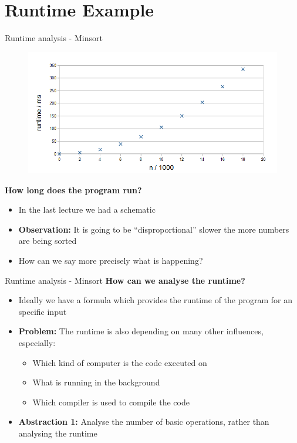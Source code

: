 \section{Runtime Example}



\begin{frame}{Runtime analysis - Minsort}
  \vspace{-1em}
  \begin{figure}[!h]
    \includegraphics[width=0.75\linewidth]{Images/MinSort/Minsort.png}
    \label{fig:introduction:minsort_runtime}
  \end{figure}
  \vspace{-0.5em}
  \textbf{How long does the program run?}
  \begin{itemize}
    \item
      In the last lecture we had a schematic
    \item
      \textbf{Observation:} It is going to be \enquote{disproportional} slower
      the more numbers are being sorted
    \item
      How can we say more precisely what is happening?
  \end{itemize}
\end{frame}


\begin{frame}{Runtime analysis - Minsort}
  \textbf{How can we analyse the runtime?}
  \begin{itemize}
    \item
      Ideally we have a formula which provides the runtime of the program for
      an specific input
    \item<2- |handout:1>
      \textbf{Problem:}
      The runtime is also depending on many other influences, especially:
      \begin{itemize}
        \item
          Which kind of computer is the code executed on
        \item What is running in the background
        \item Which compiler is used to compile the code
      \end{itemize}
    \item<3- |handout:1>
      \textbf{Abstraction 1:}
      Analyse the number of basic operations, rather than analysing the runtime
  \end{itemize}
\end{frame}